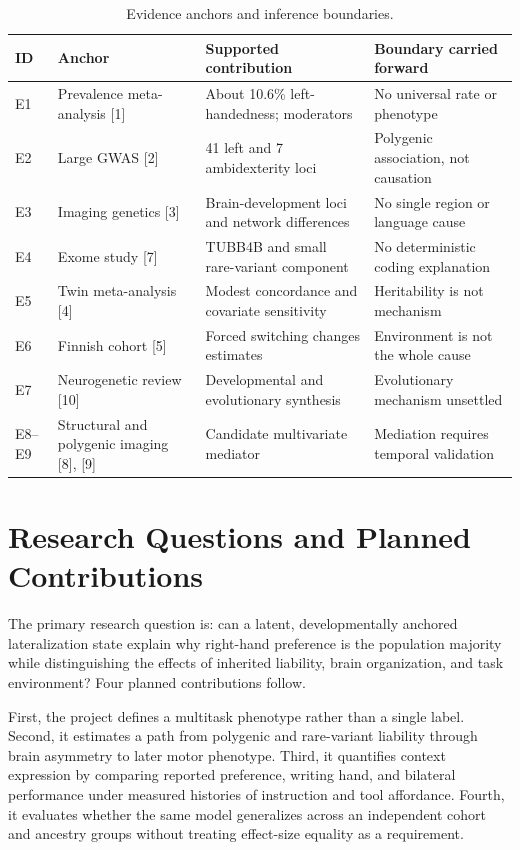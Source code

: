 \documentclass[10pt,conference]{IEEEtran}
\begin{document}
\begin{table}[t]
\caption{Evidence anchors and inference boundaries.}
\label{tab:evidence}
\centering
\small
\begin{tabularx}{\columnwidth}{@{}p{}p{}YY@{}}
\toprule
ID & Anchor & Supported contribution & Boundary carried forward \\
\midrule
E1 & Prevalence meta-analysis [1] & About 10.6\% left-handedness; moderators & No universal rate or phenotype \\
E2 & Large GWAS [2] & 41 left and 7 ambidexterity loci & Polygenic association, not causation \\
E3 & Imaging genetics [3] & Brain-development loci and network differences & No single region or language cause \\
E4 & Exome study [7] & TUBB4B and small rare-variant component & No deterministic coding explanation \\
E5 & Twin meta-analysis [4] & Modest concordance and covariate sensitivity & Heritability is not mechanism \\
E6 & Finnish cohort [5] & Forced switching changes estimates & Environment is not the whole cause \\
E7 & Neurogenetic review [10] & Developmental and evolutionary synthesis & Evolutionary mechanism unsettled \\
E8--E9 & Structural and polygenic imaging [8], [9] & Candidate multivariate mediator & Mediation requires temporal validation \\
\bottomrule
\end{tabularx}
\end{table}

\section{Research Questions and Planned Contributions}
The primary research question is: can a latent, developmentally anchored lateralization state explain why right-hand preference is the population majority while distinguishing the effects of inherited liability, brain organization, and task environment? Four planned contributions follow.

First, the project defines a multitask phenotype rather than a single label. Second, it estimates a path from polygenic and rare-variant liability through brain asymmetry to later motor phenotype. Third, it quantifies context expression by comparing reported preference, writing hand, and bilateral performance under measured histories of instruction and tool affordance. Fourth, it evaluates whether the same model generalizes across an independent cohort and ancestry groups without treating effect-size equality as a requirement.
\end{document}
